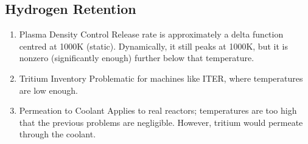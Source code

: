 \documentclass[12pt]{article}
\begin{document}
\subsection{Hydrogen Retention}

\begin{enumerate}
    \item Plasma Density Control
        Release rate is approximately a delta function centred at 1000K (static). Dynamically, it still peaks at 1000K, but it is nonzero (significantly enough) further below that temperature.
    \item Tritium Inventory
        Problematic for machines like ITER, where temperatures are low enough.
    \item Permeation to Coolant
        Applies to real reactors; temperatures are too high that the previous problems are negligible. However, tritium would permeate through the coolant.
\end{enumerate}
\end{document}
